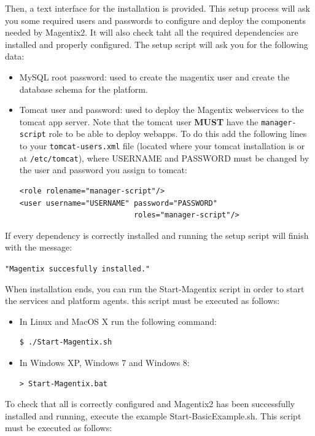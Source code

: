 Then, a text interface for the installation is provided. This setup process will ask you some required users and passwords to configure and deploy the components needed by Magentix2. It will also check taht all the required dependencies are installed and properly configured. The setup script will ask you for the following data:
\begin{itemize}
    \item MySQL root password: used to create the magentix user and create the database schema for the platform.
    \item Tomcat user and password: used to deploy the Magentix webservices to the tomcat app server. Note that the tomcat user \textbf{MUST} have the \texttt{manager-script} role to be able to deploy webapps. To do this add the following lines to your \texttt{tomcat-users.xml} file (located where your tomcat installation is or at \texttt{/etc/tomcat}), where USERNAME and PASSWORD must be changed by the user and password you assign to tomcat:
    \begin{verbatim}
<role rolename="manager-script"/>
<user username="USERNAME" password="PASSWORD" 
                          roles="manager-script"/>
    \end{verbatim}
    
\end{itemize}

If every dependency is correctly installed and running the setup script will finish with the message: 
\begin{center}
\texttt{"Magentix succesfully installed."}
\end{center}

When installation ends, you can run the Start-Magentix script in order to start the services and platform agents. this script must be executed as follows:

\begin{itemize}
    \item In Linux and MacOS X run the following command:
\begin{verbatim}
$ ./Start-Magentix.sh
\end{verbatim}
    \item In Windows XP, Windows 7 and Windows 8:
\begin{verbatim}
> Start-Magentix.bat
\end{verbatim}
\end{itemize}

To check that all is correctly configured and Magentix2 has been successfully installed and running, execute the example Start-BasicExample.sh.
This script must be executed as follows:

